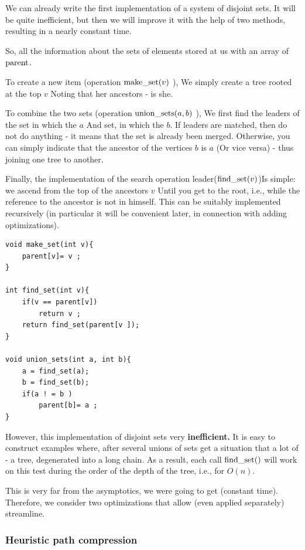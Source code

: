 We can already write the first implementation of a system of disjoint sets. It will be quite inefficient, but then we will improve it with the help of two methods, resulting in a nearly constant time.

So, all the information about the sets of elements stored at us with an array of ${\rm parent}$.

To create a new item (operation ${\rm make \_set} (v)$ ), We simply create a tree rooted at the top $v$ Noting that her ancestors - is she.

To combine the two sets (operation ${\rm union \_sets} (a, b)$ ), We first find the leaders of the set in which the $a$ And set, in which the $b$. If leaders are matched, then do not do anything - it means that the set is already been merged. Otherwise, you can simply indicate that the ancestor of the vertices $b$ is $a$ (Or vice versa) - thus joining one tree to another.

Finally, the implementation of the search operation leader(${\rm find \_set} (v)$)Is simple: we ascend from the top of the ancestors $v$ Until you get to the root, i.e., while the reference to the ancestor is not in himself. This can be suitably implemented recursively (in particular it will be convenient later, in connection with adding optimizations).

\begin{verbatim}
void make_set(int v){
    parent[v]= v ;
}
 
int find_set(int v){
    if(v == parent[v])
        return v ;
    return find_set(parent[v ]);
}
 
void union_sets(int a, int b){
    a = find_set(a);
    b = find_set(b);
    if(a ! = b )
        parent[b]= a ;
} 
\end{verbatim}
However, this implementation of disjoint sets very \textbf{inefficient.} It is easy to construct examples where, after several unions of sets get a situation that a lot of - a tree, degenerated into a long chain. As a result, each call ${\rm find \_set}()$ will work on this test during the order of the depth of the tree, i.e., for $O (n)$.

This is very far from the asymptotics, we were going to get (constant time). Therefore, we consider two optimizations that allow (even applied separately) streamline.

\subsubsection{ Heuristic path compression }


